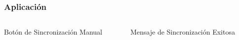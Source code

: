 \documentclass[14pt]{beamer}
\begin{document}
\begin{frame}
\frametitle{Aplicación}

\begin{columns}

\begin{column}{0.5\textwidth}
\begin{center}

\begin{small}
\caption{Botón de Sincronización Manual}
\end{small}
\end{center}
\end{column}


\begin{column}{0.5\textwidth}
\begin{center}

\begin{small}
\caption{Mensaje de Sincronización Exitosa}
\end{small}
\end{center}
\end{column}


\end{columns}

\end{frame}
\end{document}
